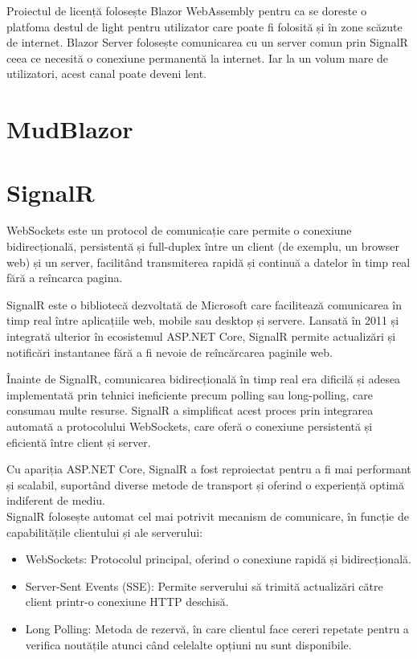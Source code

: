Proiectul de licență folosește Blazor WebAssembly pentru ca se doreste o platfoma destul de light pentru utilizator care poate fi folosită și în zone scăzute de internet.
Blazor Server folosește comunicarea cu un server comun prin SignalR ceea ce necesită o conexiune permanentă la internet. Iar la un volum mare de utilizatori, acest canal poate deveni lent.

\section{MudBlazor}

\section{SignalR}
WebSockets este un protocol de comunicație care permite o conexiune bidirecțională, persistentă și full-duplex între un client (de exemplu, un browser web) și un server, facilitând transmiterea rapidă și continuă a datelor în timp real fără a reîncarca pagina. \parencite{signalR}

SignalR este o bibliotecă dezvoltată de Microsoft care facilitează comunicarea în timp real între aplicațiile web, mobile sau desktop și servere. Lansată în 2011 și integrată ulterior în ecosistemul ASP.NET Core, SignalR permite actualizări și notificări instantanee fără a fi nevoie de reîncărcarea paginile web. \parencite{signalR}

Înainte de SignalR, comunicarea bidirecțională în timp real era dificilă și adesea implementată prin tehnici ineficiente precum polling sau long-polling, care consumau multe resurse. SignalR a simplificat acest proces prin integrarea automată a protocolului WebSockets, care oferă o conexiune persistentă și eficientă între client și server. \parencite{signalR}

Cu apariția ASP.NET Core, SignalR a fost reproiectat pentru a fi mai performant și scalabil, suportând diverse metode de transport și oferind o experiență optimă indiferent de mediu. \parencite{signalR}
\\SignalR folosește automat cel mai potrivit mecanism de comunicare, în funcție de capabilitățile clientului și ale serverului:
\begin{itemize}
    \item WebSockets: Protocolul principal, oferind o conexiune rapidă și bidirecțională.
    \item Server-Sent Events (SSE): Permite serverului să trimită actualizări către client printr-o conexiune HTTP deschisă.
    \item Long Polling: Metoda de rezervă, în care clientul face cereri repetate pentru a verifica noutățile atunci când celelalte opțiuni nu sunt disponibile.
\end{itemize}\parencite{signalR}

